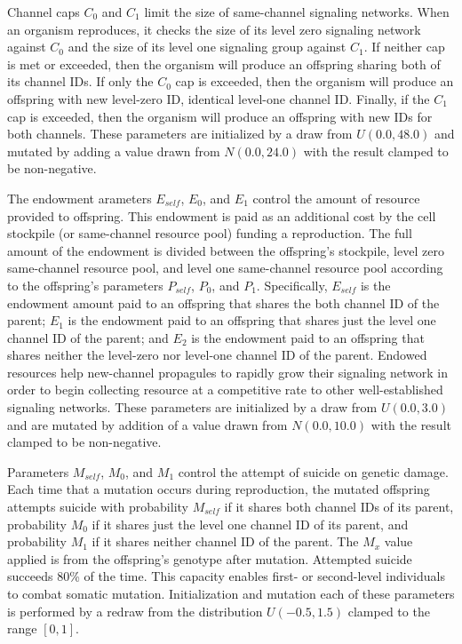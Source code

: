 Channel caps $C_0$ and $C_1$ limit the size of same-channel signaling networks.
When an organism reproduces, it checks the size of its level zero signaling network against $C_0$ and the size of its level one signaling group against $C_1$.
If neither cap is met or exceeded, then the organism will produce an offspring sharing both of its channel IDs.
If only the $C_0$ cap is exceeded, then the organism will produce an offspring with new level-zero ID, identical level-one channel ID.
Finally, if the $C_1$ cap is exceeded, then the organism will produce an offspring with new IDs for both channels.
These parameters are initialized by a draw from $U(0.0, 48.0)$ and mutated by adding a value drawn from $N(0.0,24.0)$ with the result clamped to be non-negative.

The endowment arameters $E_{self}$, $E_0$, and $E_1$ control the amount of resource provided to offspring.
This endowment is paid as an additional cost by the cell stockpile (or same-channel resource pool) funding a reproduction.
The full amount of the endowment is divided between the offspring's stockpile, level zero same-channel resource pool, and level one same-channel resource pool according to the offspring's parameters $P_{self}$, $P_0$, and $P_1$.
Specifically, $E_{self}$ is the endowment amount paid to an offspring that shares the both channel ID of the parent;
$E_1$ is the endowment paid to an offspring that shares just the level one channel ID of the parent;
and $E_2$ is the endowment paid to an offspring that shares neither the level-zero nor level-one channel ID of the parent.
Endowed resources help new-channel propagules to rapidly grow their signaling network in order to begin collecting resource at a competitive rate to other well-established signaling networks.
These parameters are initialized by a draw from $U(0.0, 3.0)$ and are mutated by addition of a value drawn from $N(0.0,10.0)$ with the result clamped to be non-negative.

Parameters $M_{self}$, $M_0$, and $M_1$ control the attempt of suicide on genetic damage.
Each time that a mutation occurs during reproduction, the mutated offspring attempts suicide with probability $M_{self}$ if it shares both channel IDs of its parent, probability $M_0$ if it shares just the level one channel ID of its parent, and probability $M_1$ if it shares neither channel ID of the parent.
The $M_x$ value applied is from the offspring's genotype after mutation.
Attempted suicide succeeds %
80\% of the time.
This capacity enables first- or second-level individuals to combat somatic mutation.
Initialization and mutation each of these parameters is performed by a redraw from the distribution $U(-0.5,1.5)$ clamped to the range $[0,1]$.

